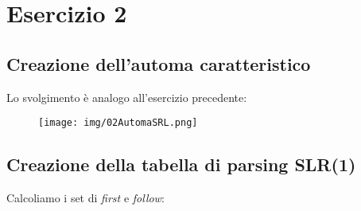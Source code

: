 \documentclass[11pt]{article}
\begin{document}
\newpage
\section{Esercizio 2}
\subsection{Creazione dell'automa caratteristico}
Lo svolgimento è analogo all'esercizio precedente:

\begin{figure}[H]
  \centering
  \texttt{[image: img/02AutomaSRL.png]}
  \label{fig:02-automa}
\end{figure}

\subsection{Creazione della tabella di parsing SLR(1)}
Calcoliamo i set di \textit{first} e \textit{follow}:
\end{document}
